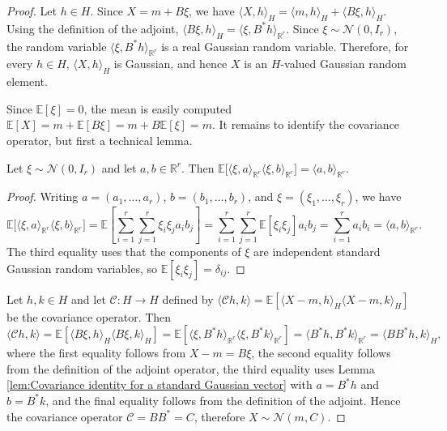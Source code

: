 \begin{proof}
Let \(h\in H\). Since \(X=m+B\xi\), we have
\(\langle X,h\rangle_H=\langle m,h\rangle_H+\langle B\xi,h\rangle_H\). Using the definition of the adjoint, \(\langle B\xi,h\rangle_H=\langle \xi,B^*h\rangle_{\mathbb R^r}\). Since \(\xi\sim\mathcal N(0,I_r)\), the random variable \(\langle \xi,B^*h\rangle_{\mathbb R^r}\) is a real Gaussian random variable. Therefore, for every \(h\in H\), \(\langle X,h\rangle_H\) is Gaussian, and hence \(X\) is an \(H\)-valued Gaussian random element.

Since \(\mathbb E[\xi]=0\), the mean is easily computed \(\mathbb E[X]=m+\mathbb E[B\xi]=m+B\mathbb E[\xi]=m\). It remains to identify the covariance operator, but first a technical lemma.
\begin{lemma}\label{lem:Covariance identity for a standard Gaussian vector}
Let \(\xi\sim\mathcal N(0,I_r)\) and let \(a,b\in\mathbb R^r\). Then \(\mathbb E\bigl[\langle \xi,a\rangle_{\mathbb R^r}\langle \xi,b\rangle_{\mathbb R^r}\bigr]
=
\langle a,b\rangle_{\mathbb R^r}
\).
\end{lemma}

\begin{proof}
Writing \(a=(a_1,\ldots,a_r)\), \(b=(b_1,\ldots,b_r)\), and \(\xi=(\xi_1,\ldots,\xi_r)\), we have
\[
\mathbb E\bigl[\langle \xi,a\rangle_{\mathbb R^r}\langle \xi,b\rangle_{\mathbb R^r}\bigr]
=
\mathbb E\left[\sum_{i=1}^r\sum_{j=1}^r\xi_i\xi_j a_i b_j\right]
=
\sum_{i=1}^r\sum_{j=1}^r\mathbb E[\xi_i\xi_j]a_ib_j
=
\sum_{i=1}^ra_ib_i
=
\langle a,b\rangle_{\mathbb R^r}.
\]
The third equality uses that the components of \(\xi\) are independent standard Gaussian random variables, so \(\mathbb E[\xi_i\xi_j]=\delta_{ij}\).
\end{proof}

Let \(h,k\in H\) and let \(\mathscr C:H \to H\) defined by \(\langle \mathscr Ch,k\rangle = \mathbb E[\langle X-m,h\rangle_H\langle X-m,k\rangle_H]\) be the covariance operator. Then
\[
\langle \mathscr Ch,k\rangle =\mathbb E[\langle B\xi,h\rangle_H\langle B\xi,k\rangle_H]=\mathbb E[\langle \xi,B^*h\rangle_{\mathbb R^r}\langle \xi,B^*k\rangle_{\mathbb R^r}]=\langle B^*h,B^*k\rangle_{\mathbb R^r}=\langle BB^*h,k\rangle_H,
\]
where the first equality follows from \(X-m=B\xi\), the second equality follows from the definition of the adjoint operator, the third equality uses Lemma \ref{lem:Covariance identity for a standard Gaussian vector} with \(a=B^*h\) and \(b=B^*k\), and the final equality follows from the definition of the adjoint. Hence the covariance operator \(\mathscr C = BB^* = C\), therefore \(X\sim\mathcal N(m,C)\).
\end{proof}

